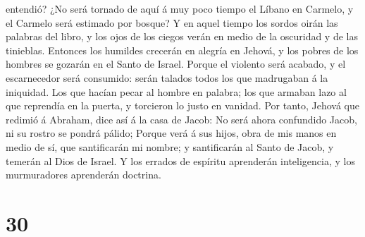 entendió?  ¿No será tornado de aquí á muy poco tiempo el
Líbano en Carmelo, y el Carmelo será estimado por bosque?
 Y en aquel tiempo los sordos oirán las palabras del
libro, y los ojos de los ciegos verán en medio de la oscuridad y de las
tinieblas.  Entonces los humildes crecerán en alegría en
Jehová, y los pobres de los hombres se gozarán en el Santo de Israel.
 Porque el violento será acabado, y el escarnecedor será
consumido: serán talados todos los que madrugaban á la iniquidad.
 Los que hacían pecar al hombre en palabra; los que
armaban lazo al que reprendía en la puerta, y torcieron lo justo en
vanidad.  Por tanto, Jehová que redimió á Abraham, dice
así á la casa de Jacob: No será ahora confundido Jacob, ni su rostro se
pondrá pálido;  Porque verá á sus hijos, obra de mis
manos en medio de sí, que santificarán mi nombre; y santificarán al
Santo de Jacob, y temerán al Dios de Israel.  Y los
errados de espíritu aprenderán inteligencia, y los murmuradores
aprenderán doctrina.

\hypertarget{section-29}{%
\section{30}\label{section-29}}

